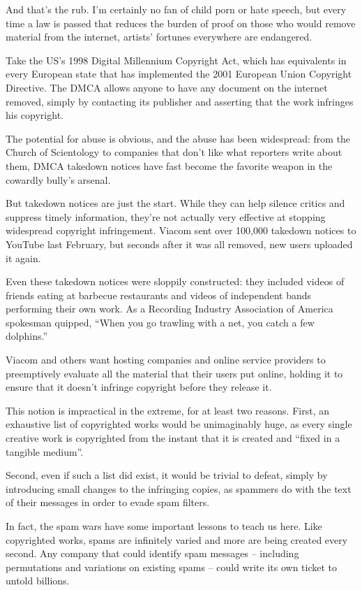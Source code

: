 And that's the rub. I'm certainly no fan of child porn or hate
speech, but every time a law is passed that reduces the burden of
proof on those who would remove material from the internet,
artists' fortunes everywhere are endangered.

Take the US's 1998 Digital Millennium Copyright Act, which has
equivalents in every European state that has implemented the 2001
European Union Copyright Directive. The DMCA allows anyone to have
any document on the internet removed, simply by contacting its
publisher and asserting that the work infringes his copyright.

The potential for abuse is obvious, and the abuse has been
widespread: from the Church of Scientology to companies that don't
like what reporters write about them, DMCA takedown notices have
fast become the favorite weapon in the cowardly bully's arsenal.

But takedown notices are just the start. While they can help
silence critics and suppress timely information, they're not
actually very effective at stopping widespread copyright
infringement. Viacom sent over 100,000 takedown notices to YouTube
last February, but seconds after it was all removed, new users
uploaded it again.

Even these takedown notices were sloppily constructed: they
included videos of friends eating at barbecue restaurants and
videos of independent bands performing their own work. As a
Recording Industry Association of America spokesman quipped, ``When
you go trawling with a net, you catch a few dolphins.''

Viacom and others want hosting companies and online service
providers to preemptively evaluate all the material that their
users put online, holding it to ensure that it doesn't infringe
copyright before they release it.

This notion is impractical in the extreme, for at least two
reasons. First, an exhaustive list of copyrighted works would be
unimaginably huge, as every single creative work is copyrighted
from the instant that it is created and ``fixed in a tangible
medium''.

Second, even if such a list did exist, it would be trivial to
defeat, simply by introducing small changes to the infringing
copies, as spammers do with the text of their messages in order to
evade spam filters.

In fact, the spam wars have some important lessons to teach us
here. Like copyrighted works, spams are infinitely varied and more
are being created every second. Any company that could identify
spam messages -- including permutations and variations on existing
spams -- could write its own ticket to untold billions.

